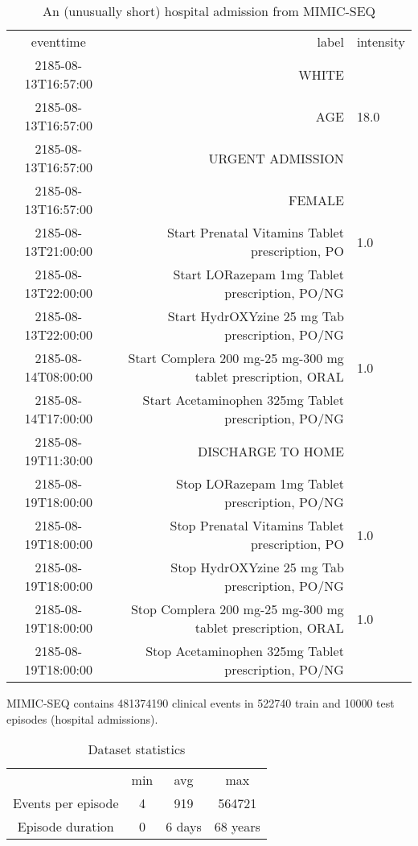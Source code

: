 \begin{table*}[]
    \centering
    \begin{tabular}{c|r|l}
    eventtime &	label &	intensity \\
    2185-08-13T16:57:00 &	WHITE	 & \\
    2185-08-13T16:57:00 &	AGE &	18.0 \\
    2185-08-13T16:57:00 &	URGENT ADMISSION &	 \\
    2185-08-13T16:57:00 &	FEMALE &	 \\
    2185-08-13T21:00:00 &	Start Prenatal Vitamins Tablet prescription, PO &	1.0 \\
    2185-08-13T22:00:00 &	Start LORazepam 1mg Tablet prescription, PO/NG &	 \\
    2185-08-13T22:00:00 &	Start HydrOXYzine 25 mg Tab prescription, PO/NG &	 \\
    2185-08-14T08:00:00 &	Start Complera 200 mg-25 mg-300 mg tablet prescription, ORAL &	1.0 \\
    2185-08-14T17:00:00 &	Start Acetaminophen 325mg Tablet prescription, PO/NG &	 \\
    2185-08-19T11:30:00 &	DISCHARGE TO HOME &	 \\
    2185-08-19T18:00:00 &	Stop LORazepam 1mg Tablet prescription, PO/NG &	 \\
    2185-08-19T18:00:00 &	Stop Prenatal Vitamins Tablet prescription, PO &	1.0 \\
    2185-08-19T18:00:00 &	Stop HydrOXYzine 25 mg Tab prescription, PO/NG &	 \\
    2185-08-19T18:00:00 &	Stop Complera 200 mg-25 mg-300 mg tablet prescription, ORAL &	1.0 \\
    2185-08-19T18:00:00 &	Stop Acetaminophen 325mg Tablet prescription, PO/NG &	 \\
    \end{tabular}
    \caption{An (unusually short) hospital admission from MIMIC-SEQ}
\end{table*}

MIMIC-SEQ contains 481374190 clinical events in 522740 train and 10000 test episodes (hospital admissions).

\begin{table}[H]
    \centering
    \begin{tabular}{c|c|c|c}
         & min & avg & max \\
         Events per episode & 4 & 919 & 564721 \\
         Episode duration & 0 & 6 days & 68 years \\
    \end{tabular}
    \caption{Dataset statistics}
    \label{tab:stats}
\end{table}

